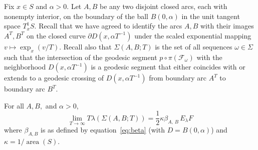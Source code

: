 \documentclass[AHL, Unicode, longabstracts, published]{cedram}
\DeclareMathOperator{\area}{area}
\begin{document}
Fix $x\in S$ and $\alpha >0$. Let $A,B$ be any two disjoint closed arcs, each with nonempty interior, on the boundary of the ball $B (0,\alpha)$ in the unit tangent space $T^1_{x}S$. Recall that we have agreed to identify the arcs $A,B$ with their images $A^{T},B^{T}$ on the closed curve $\partial D(x, \alpha T^{-1})$ under the scaled exponential mapping $v\mapsto \exp _{x}(v/T)$. Recall also that $\Sigma(A,B;T)$ is the set of all sequences $\omega \in \Sigma$ such that the intersection of the geodesic segment $p\circ\pi (\mathcal{F}_{\omega})$ with the neighborhood $D(x, \alpha T^{-1})$ is a geodesic segment that either coincides with or extends to a geodesic crossing of $D(x, \alpha T^{-1})$ from boundary arc $A^{T}$ to boundary arc $B^{T}$.

\begin{prop}\label{proposition:measure-asymptotics}
For all $A,B,$ and $\alpha >0$,
\begin{equation}\label{eq:measure-asymptotics-again}
\lim_{T \rightarrow \infty} T\lambda (\Sigma (A,B;T))=
\frac{1}{2} \kappa \beta_{A,\,B}\,E_{\lambda}F
\end{equation}
where $\beta_{A,B}$ is as defined by equation~\eqref{eq:beta} (with $D=B(0, \alpha)$) and $\kappa=1/\area(S)$.
\end{prop}
\end{document}
